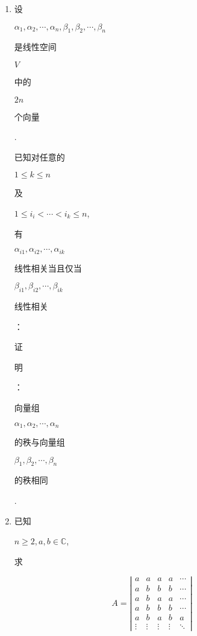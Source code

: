 \documentclass[10pt]{article}
\begin{document}
\begin{enumerate}
  \item \begin{CJK}{UTF8}{mj}设\end{CJK} $\alpha_{1}, \alpha_{2}, \cdots, \alpha_{n}, \beta_{1}, \beta_{2}, \cdots, \beta_{n}$ \begin{CJK}{UTF8}{mj}是线性空间\end{CJK} $V$ \begin{CJK}{UTF8}{mj}中的\end{CJK} $2 n$ \begin{CJK}{UTF8}{mj}个向量\end{CJK}. \begin{CJK}{UTF8}{mj}已知对任意的\end{CJK} $1 \leq k \leq n$ \begin{CJK}{UTF8}{mj}及\end{CJK} $1 \leq i_{i}<\cdots<i_{k} \leq n$, \begin{CJK}{UTF8}{mj}有\end{CJK} $\alpha_{i 1}, \alpha_{i 2}, \cdots, \alpha_{i k}$ \begin{CJK}{UTF8}{mj}线性相关当且仅当\end{CJK} $\beta_{i 1}, \beta_{i 2}, \cdots, \beta_{i k}$ \begin{CJK}{UTF8}{mj}线性相关\end{CJK}：\begin{CJK}{UTF8}{mj}证\end{CJK} \begin{CJK}{UTF8}{mj}明\end{CJK}：\begin{CJK}{UTF8}{mj}向量组\end{CJK} $\alpha_{1}, \alpha_{2}, \cdots, \alpha_{n}$ \begin{CJK}{UTF8}{mj}的秩与向量组\end{CJK} $\beta_{1}, \beta_{2}, \cdots, \beta_{n}$ \begin{CJK}{UTF8}{mj}的秩相同\end{CJK}.

  \item \begin{CJK}{UTF8}{mj}已知\end{CJK} $n \geq 2, a, b \in \mathbb{C}$, \begin{CJK}{UTF8}{mj}求\end{CJK}

\end{enumerate}
$$
A=\left|\begin{array}{ccccc}
a & a & a & a & \cdots \\
a & b & b & b & \cdots \\
a & b & a & a & \cdots \\
a & b & b & b & \cdots \\
a & b & a & b & a \\
\vdots & \vdots & \vdots & \vdots & \ddots
\end{array}\right|
$$
\end{document}
